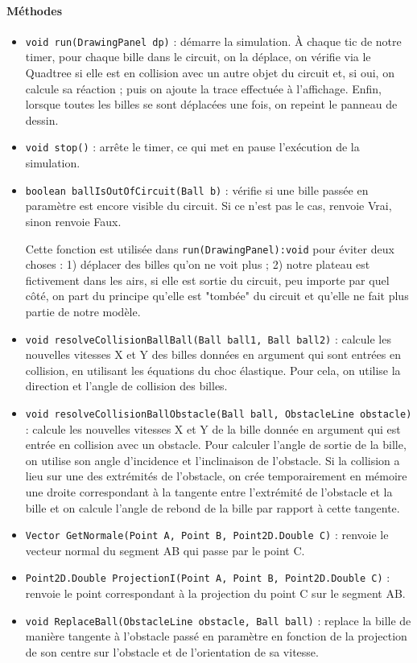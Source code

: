 \documentclass{report}
\begin{document}
\paragraph*{Méthodes}
\begin{itemize}
\item \texttt{void run(DrawingPanel dp)} : démarre la simulation. À chaque tic de notre timer, pour chaque bille dans le circuit, on la déplace, on vérifie via le Quadtree si elle est en collision avec un autre objet du circuit et, si oui, on calcule sa réaction ; puis on ajoute la trace effectuée à l'affichage. Enfin, lorsque toutes les billes se sont déplacées une fois, on repeint le panneau de dessin.
\item \texttt{void stop()} : arrête le timer, ce qui met en pause l'exécution de la simulation. 
\item \texttt{boolean ballIsOutOfCircuit(Ball b)} : vérifie si une bille passée en paramètre est encore visible du circuit. Si ce n'est pas le cas, renvoie Vrai, sinon renvoie Faux. 

Cette fonction est utilisée dans \texttt{run(DrawingPanel):void} pour éviter deux choses : 1) déplacer des billes qu'on ne voit plus ; 2) notre plateau est fictivement dans les airs, si elle est sortie du circuit, peu importe par quel côté, on part du principe qu'elle est "tombée" du circuit et qu'elle ne fait plus partie de notre modèle.
\item \texttt{void resolveCollisionBallBall(Ball ball1, Ball ball2)} : calcule les nouvelles vitesses X et Y des billes données en argument qui sont entrées en collision, en utilisant les équations du choc élastique. Pour cela, on utilise la direction et l'angle de collision des billes.
\item \texttt{void resolveCollisionBallObstacle(Ball ball, ObstacleLine obstacle)} : calcule les nouvelles vitesses X et Y de la bille donnée en argument qui est entrée en collision avec un obstacle. Pour calculer l'angle de sortie de la bille, on utilise son angle d'incidence et l'inclinaison de l'obstacle. Si la collision a lieu sur une des extrémités de l'obstacle, on crée temporairement en mémoire une droite correspondant à la tangente entre l'extrémité de l'obstacle et la bille et on calcule l'angle de rebond de la bille par rapport à cette tangente.
\item \texttt{Vector GetNormale(Point A, Point B, Point2D.Double C)} : renvoie le vecteur normal du segment AB qui passe par le point C.
\item \texttt{Point2D.Double ProjectionI(Point A, Point B, Point2D.Double C)} : renvoie le point correspondant à la projection du point C sur le segment AB.
\item \texttt{void ReplaceBall(ObstacleLine obstacle, Ball ball)} : replace la bille de manière tangente à l'obstacle passé en paramètre en fonction de la projection de son centre sur l'obstacle et de l'orientation de sa vitesse.
\end{itemize}
\end{document}
